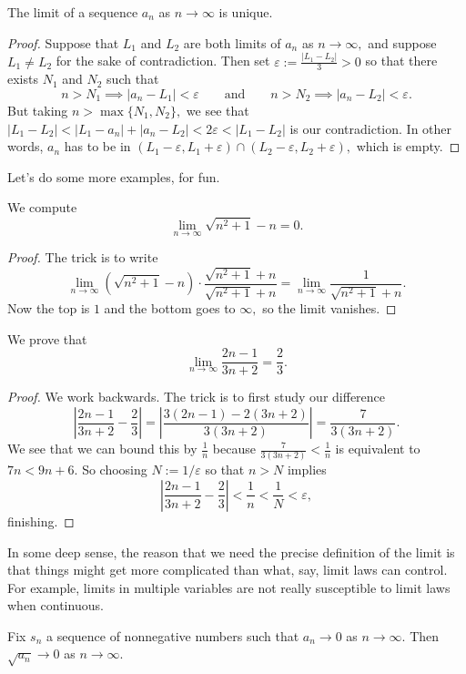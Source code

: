 \documentclass[../notes.tex]{subfiles}
\begin{document}
\begin{proposition}
	The limit of a sequence $a_n$ as $n\to\infty$ is unique.
\end{proposition}
\begin{proof}
	Suppose that $L_1$ and $L_2$ are both limits of $a_n$ as $n\to\infty,$ and suppose $L_1\ne L_2$ for the sake of contradiction. Then set $\varepsilon:=\frac{|L_1-L_2|}3>0$ so that there exists $N_1$ and $N_2$ such that
	\[n>N_1\implies|a_n-L_1|<\varepsilon\qquad\text{and}\qquad n>N_2\implies|a_n-L_2|<\varepsilon.\]
	But taking $n>\max\{N_1,N_2\},$ we see that $|L_1-L_2|<|L_1-a_n|+|a_n-L_2|<2\varepsilon<|L_1-L_2|$ is our contradiction. In other words, $a_n$ has to be in $(L_1-\varepsilon,L_1+\varepsilon)\cap(L_2-\varepsilon,L_2+\varepsilon),$ which is empty.
\end{proof}
Let's do some more examples, for fun.
\begin{exercise}[Ross 7.5(a)]
	We compute
	\[\lim_{n\to\infty}\sqrt{n^2+1}-n=0.\]
\end{exercise}
\begin{proof}
	The trick is to write
	\[\lim_{n\to\infty}\left(\sqrt{n^2+1}-n\right)\cdot\frac{\sqrt{n^2+1}+n}{\sqrt{n^2+1}+n}=\lim_{n\to\infty}\frac1{\sqrt{n^2+1}+n}.\]
	Now the top is $1$ and the bottom goes to $\infty,$ so the limit vanishes.
\end{proof}
\begin{exercise}
	We prove that
	\[\lim_{n\to\infty}\frac{2n-1}{3n+2}=\frac23.\]
\end{exercise}
\begin{proof}
	We work backwards. The trick is to first study our difference
	\[\left|\frac{2n-1}{3n+2}-\frac23\right|=\left|\frac{3(2n-1)-2(3n+2)}{3(3n+2)}\right|=\frac7{3(3n+2)}.\]
	We see that we can bound this by $\frac1n$ because $\frac7{3(3n+2)}<\frac1n$ is equivalent to $7n<9n+6.$ So choosing $\boxed{N:=1/\varepsilon}$ so that $n>N$ implies
	\[\left|\frac{2n-1}{3n+2}-\frac23\right|<\frac1n<\frac1N<\varepsilon,\]
	finishing.
\end{proof}
\begin{remark}[Philosophy]
	In some deep sense, the reason that we need the precise definition of the limit is that things might get more complicated than what, say, limit laws can control. For example, limits in multiple variables are not really susceptible to limit laws when continuous.
\end{remark}
\begin{exercise}[Ross 8.3]
	Fix $s_n$ a sequence of nonnegative numbers such that $a_n\to0$ as $n\to\infty.$ Then $\sqrt{a_n}\to0$ as $n\to\infty.$
\end{exercise}
\end{document}
